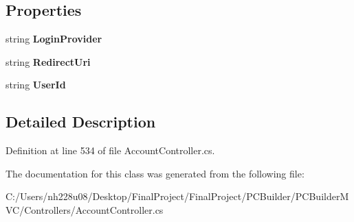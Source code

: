 \subsection*{Properties}
\begin{DoxyCompactItemize}
\item 
string {\bfseries Login\+Provider}\hypertarget{class_p_c_builder_m_v_c_1_1_controllers_1_1_account_controller_1_1_challenge_result_ac7cac910c22fc1c95c7a5a15f575cd5e}{}\label{class_p_c_builder_m_v_c_1_1_controllers_1_1_account_controller_1_1_challenge_result_ac7cac910c22fc1c95c7a5a15f575cd5e}

\item 
string {\bfseries Redirect\+Uri}\hypertarget{class_p_c_builder_m_v_c_1_1_controllers_1_1_account_controller_1_1_challenge_result_ac4ddc0bc44bfccf0a772e482d9499826}{}\label{class_p_c_builder_m_v_c_1_1_controllers_1_1_account_controller_1_1_challenge_result_ac4ddc0bc44bfccf0a772e482d9499826}

\item 
string {\bfseries User\+Id}\hypertarget{class_p_c_builder_m_v_c_1_1_controllers_1_1_account_controller_1_1_challenge_result_ab685e3369f605b4bb9b92cc3cd7bb68e}{}\label{class_p_c_builder_m_v_c_1_1_controllers_1_1_account_controller_1_1_challenge_result_ab685e3369f605b4bb9b92cc3cd7bb68e}

\end{DoxyCompactItemize}


\subsection{Detailed Description}


Definition at line 534 of file Account\+Controller.\+cs.



The documentation for this class was generated from the following file\+:\begin{DoxyCompactItemize}
\item 
C\+:/\+Users/nh228u08/\+Desktop/\+Final\+Project/\+Final\+Project/\+P\+C\+Builder/\+P\+C\+Builder\+M\+V\+C/\+Controllers/Account\+Controller.\+cs\end{DoxyCompactItemize}
